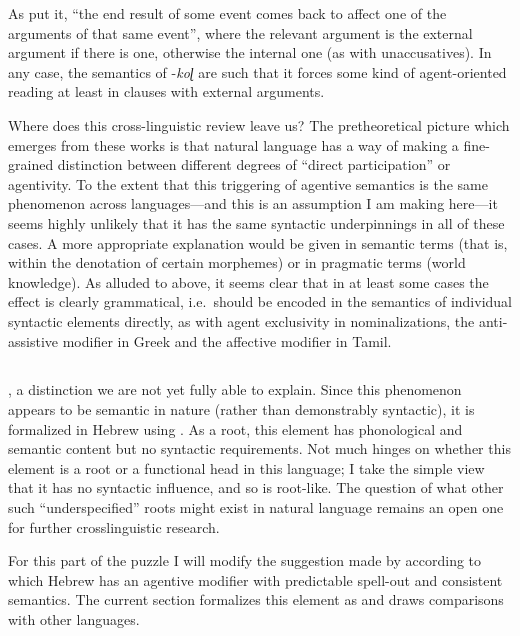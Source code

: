 As \citet[165]{sundaresanmcfadden17} put it, ``the end result of some event comes back to affect one of the arguments of that same event'', where the relevant argument is the external argument if there is one, otherwise the internal one (as with unaccusatives). In any case, the semantics of -\emph{koɭ} are such that it forces some kind of agent-oriented reading at least in clauses with external arguments.

Where does this cross-linguistic review leave us? The pretheoretical picture which emerges from these works is that natural language has a way of making a fine-grained distinction between different degrees of ``direct participation'' or agentivity. To the extent that this triggering of agentive semantics is the same phenomenon across languages---and this is an assumption I am making here---it seems highly unlikely that it has the same syntactic underpinnings in all of these cases. A more appropriate explanation would be given in semantic terms (that is, within the denotation of certain morphemes) or in pragmatic terms (world knowledge). As alluded to above, it seems clear that in at least some cases the effect is clearly grammatical, i.e.~should be encoded in the semantics of individual syntactic elements directly, as with agent exclusivity in nominalizations, the anti-assistive modifier in Greek and the affective modifier in Tamil.


	\subsection{\va} \label{voice:va:heb}

, a distinction we are not yet fully able to explain. Since this phenomenon appears to be semantic in nature (rather than demonstrably syntactic), it is formalized in Hebrew using {\va}. As a root, this element has phonological and semantic content but no syntactic requirements. Not much hinges on whether this element is a root or a functional head in this language; I take the simple view that it has no syntactic influence, and so is root-like. The question of what other such ``underspecified'' roots might exist in natural language remains an open one for further crosslinguistic research.


For this part of the puzzle I will modify the suggestion made by \cite{doron03} according to which Hebrew has an agentive modifier with predictable spell-out and consistent semantics. The current section formalizes this element as {\va} and draws comparisons with other languages.

